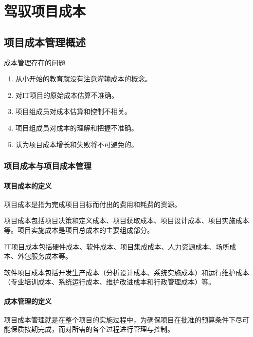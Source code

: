 \chapter{驾驭项目成本}
\section{项目成本管理概述}
成本管理存在的问题
\begin{enumerate}
	\item 从小开始的教育就没有注意灌输成本的概念。
	\item 对IT项目的原始成本估算不准确。
	\item 项目组成员对成本估算和控制不相关。
	\item 项目组成员对成本的理解和把握不准确。
	\item 认为项目成本增长和失败将不可避免的。
\end{enumerate}
\subsection{项目成本与项目成本管理}
\subsubsection{项目成本的定义}
项目成本是指为完成项目目标而付出的费用和耗费的资源。
\par 项目成本包括项目决策和定义成本、项目获取成本、项目设计成本、项目实施成本等。项目实施成本是项目总成本的主要组成部分。
\par IT项目成本包括硬件成本、软件成本、项目集成成本、人力资源成本、场所成本、外包服务成本等。
\par 软件项目成本包括开发生产成本（分析设计成本、系统实施成本）和运行维护成本（专业培训成本、系统运行成本、维护改进成本和行政管理成本）等。
\subsubsection{成本管理的定义}
项目成本管理就是在整个项目的实施过程中，为确保项目在批准的预算条件下尽可能保质按期完成，而对所需的各个过程进行管理与控制。
